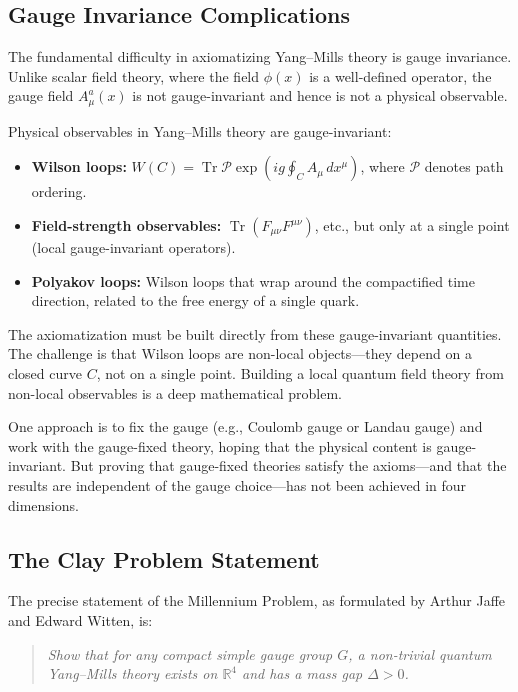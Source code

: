 \subsection{Gauge Invariance Complications}

The fundamental difficulty in axiomatizing Yang--Mills theory is gauge invariance. Unlike scalar field theory, where the field $\phi(x)$ is a well-defined operator, the gauge field $A_\mu^a(x)$ is not gauge-invariant and hence is not a physical observable.

Physical observables in Yang--Mills theory are gauge-invariant:
\begin{itemize}
  \item \textbf{Wilson loops:} $W(C) = \operatorname{Tr} \mathcal{P} \exp\left(ig \oint_C A_\mu \, dx^\mu\right)$, where $\mathcal{P}$ denotes path ordering.
  \item \textbf{Field-strength observables:} $\operatorname{Tr}(F_{\mu\nu} F^{\mu\nu})$, etc., but only at a single point (local gauge-invariant operators).
  \item \textbf{Polyakov loops:} Wilson loops that wrap around the compactified time direction, related to the free energy of a single quark.
\end{itemize}

The axiomatization must be built directly from these gauge-invariant quantities. The challenge is that Wilson loops are non-local objects---they depend on a closed curve $C$, not on a single point. Building a local quantum field theory from non-local observables is a deep mathematical problem.

One approach is to fix the gauge (e.g., Coulomb gauge or Landau gauge) and work with the gauge-fixed theory, hoping that the physical content is gauge-invariant. But proving that gauge-fixed theories satisfy the axioms---and that the results are independent of the gauge choice---has not been achieved in four dimensions.

\subsection{The Clay Problem Statement}

The precise statement of the Millennium Problem, as formulated by Arthur Jaffe and Edward Witten, is:

\begin{quote}
\textit{Show that for any compact simple gauge group $G$, a non-trivial quantum Yang--Mills theory exists on $\mathbb{R}^4$ and has a mass gap $\Delta > 0$.}
\end{quote}

